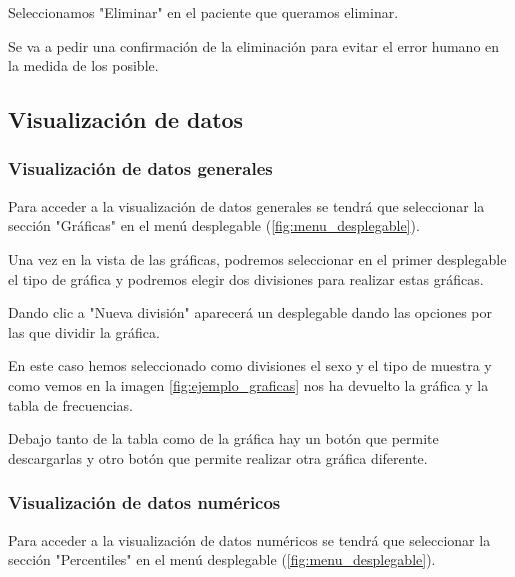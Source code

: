 
Seleccionamos "Eliminar" en el paciente que queramos eliminar.


Se va a pedir una confirmación de la eliminación para evitar el error humano en la medida de los posible.


\subsection{Visualización de datos}

\subsubsection{Visualización de datos generales}

Para acceder a la visualización de datos generales se tendrá que seleccionar la sección "Gráficas"{} en el menú desplegable (\ref{fig:menu_desplegable}).


Una vez en la vista de las gráficas, podremos seleccionar en el primer desplegable el tipo de gráfica y podremos elegir dos divisiones para realizar estas gráficas.

Dando clic a "Nueva división{}" aparecerá un desplegable dando las opciones por las que dividir la gráfica.


En este caso hemos seleccionado como divisiones el sexo y el tipo de muestra y como vemos en la imagen \ref{fig:ejemplo_graficas} nos ha devuelto la gráfica y la tabla de frecuencias.

Debajo tanto de la tabla como de la gráfica hay un botón que permite descargarlas y otro botón que permite realizar otra gráfica diferente.


\subsubsection{Visualización de datos numéricos}

Para acceder a la visualización de datos numéricos se tendrá que seleccionar la sección "Percentiles"{} en el menú desplegable (\ref{fig:menu_desplegable}).

